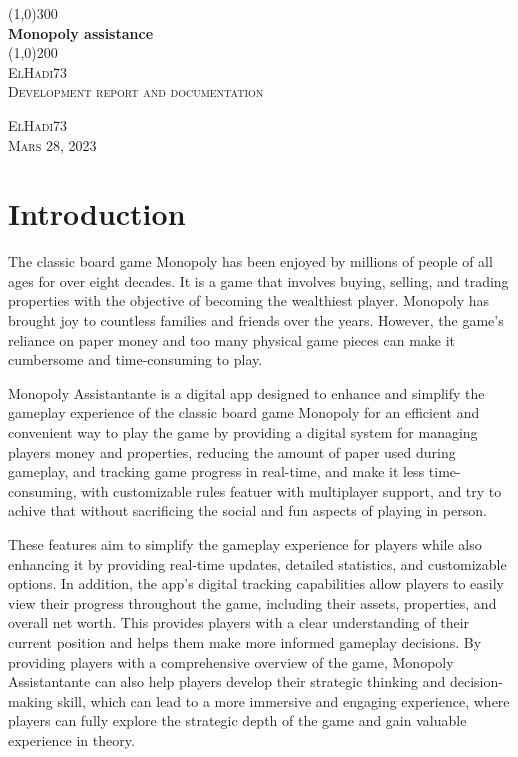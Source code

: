 \documentclass{article}
\begin{document}
\begin{titlepage}
	\begin{center}
		\line(1,0){300}\\
		[0.25in]
		\huge{\bfseries Monopoly assistance}\\
		[2mm]
		\line(1,0){200}\\
		[1.5cm]
		\textsc{\LARGE ElHadi73}\\
		[0.75cm]
		\textsc{\Large Development report and documentation}\\
		[10cm]
	\end{center}
	\begin{flushright}
		\textsc{\large ElHadi73\\
		Mars 28, 2023\\}
	\end{flushright}
\end{titlepage}

\tableofcontents
\thispagestyle{empty}
\cleardoublepage

\section{Introduction}\label{sec:intro}
        The classic board game Monopoly has been enjoyed by millions of people of all ages for over eight decades. It is a game that involves buying, selling, and trading properties with the objective of becoming the wealthiest
player. Monopoly has brought joy to countless families and friends over the years. However, the game's reliance on paper money and too many physical game pieces can make it cumbersome and time-consuming to play.

        Monopoly Assistantante is a digital app designed to enhance and simplify the gameplay experience of the classic board game Monopoly for an efficient and convenient way to play the game by providing a digital system for managing players money and properties, reducing the amount of paper used during gameplay, and tracking game progress in real-time, and make it less time-consuming, with customizable rules featuer with multiplayer support, and try to achive that without sacrificing the social and fun aspects of playing in person. 

        These features aim to simplify the gameplay experience for players while also enhancing it by providing real-time updates, detailed statistics, and customizable options. 
        In addition, the app's digital tracking capabilities allow players to easily view their progress throughout the game, including their assets, properties, and overall net worth. This provides players with a clear understanding of their current position and helps them make more informed gameplay decisions. By providing players with a comprehensive overview of the game, Monopoly Assistantante can also help players develop their strategic thinking and decision-making skill, which can lead to a more immersive and engaging experience, where players can fully explore the strategic depth of the game and gain valuable experience in theory.  
\end{document}
